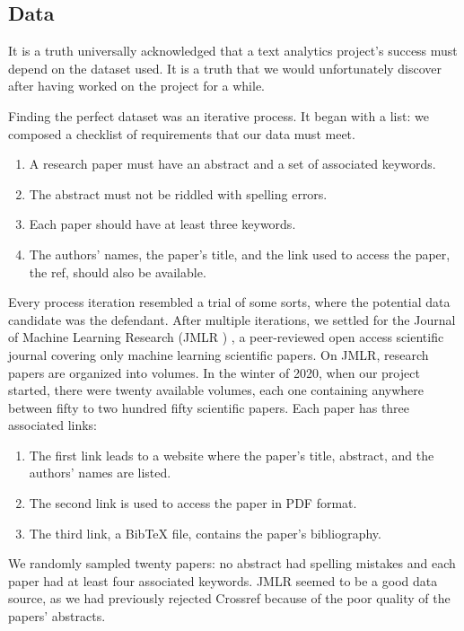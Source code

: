 \subsection{Data}

It is a truth universally acknowledged that a text analytics project's success must depend on the dataset used. It is a truth that we would unfortunately discover after having worked on the project for a while. 


Finding the perfect dataset was an iterative process. It began with a list: we composed a checklist of requirements that our data must meet. 
\begin{enumerate}
	\item A research paper must have an abstract and a set of associated keywords. 
	\item The abstract must not be riddled with spelling errors. 
	\item Each paper should have at least three keywords.
	\item The authors' names, the paper's title, and the link used to access the paper, the ref, should also be available.
\end{enumerate}

Every process iteration resembled a trial of some sorts, where the potential data candidate was the defendant. After multiple iterations, we settled for the Journal of Machine Learning Research (JMLR ) \cite{jmlr}, a peer-reviewed open access scientific journal covering only machine learning scientific papers.
On JMLR, research papers are organized into volumes. In the winter of 2020, when our project started, there were twenty available volumes, each one containing anywhere between fifty to two hundred fifty scientific papers. Each paper has three associated links: 
\begin{enumerate}
	\item The first link leads to a website where the paper's title, abstract, and the authors' names are listed. 
	\item The second link is used to access the paper in PDF format. 
	\item The third link, a BibTeX file, contains the paper's bibliography.
\end{enumerate}

We randomly sampled twenty papers: no abstract had spelling mistakes and each paper had at least four associated keywords. JMLR seemed to be a good data source, as we had previously rejected Crossref \cite{crossref} because of the poor quality of the papers' abstracts.


